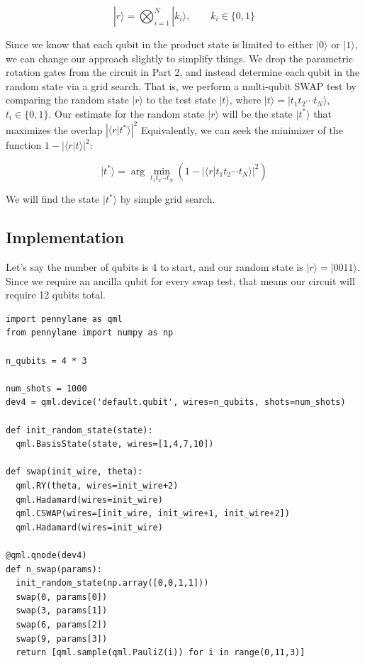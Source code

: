 \documentclass[11pt]{article}
\begin{document}
\begin{equation*}
  |r\rangle = \bigotimes_{i=1}^{N}|k_{i}\rangle, \qquad k_{i} \in \{0,1\}
\end{equation*}

Since we know that each qubit in the product state is limited to either \(|0\rangle\) or \(|1\rangle\), we can change our approach slightly to simplify things.
We drop the parametric rotation gates from the circuit in Part 2, and instead determine each qubit in the random state via a grid search.
That is, we perform a multi-qubit SWAP test by comparing the random state \(|r\rangle\) to the test state \(|t\rangle\), where \(|t\rangle = |t_1 t_2 \cdots t_N \rangle\), \(t_i \in \{ 0, 1\}\). Our estimate for the random state \(|r\rangle\) will be the state \(|t^*\rangle\) that maximizes the overlap \(\left|\langle r | t^* \rangle\right|^2\)
Equivalently, we can seek the minimizer of the function \(1-\left|\langle r | t\rangle\right|^2\):

\begin{equation*}
|t^*\rangle = \arg\min_{t_{1}t_{2}\cdots t_{N}}(1-\left|\langle r | t_1 t_2 \cdots t_N \rangle\right|^2)
\end{equation*}

We will find the state \(|t^*\rangle\) by simple grid search.

\subsection{Implementation}
\label{sec:orgd87c9eb}

Let's say the number of qubits is 4 to start, and our random state is \(|r\rangle = |0011\rangle\).
Since we require an ancilla qubit for every swap test, that means our circuit will require 12 qubits total.

\begin{verbatim}
import pennylane as qml
from pennylane import numpy as np

n_qubits = 4 * 3

num_shots = 1000
dev4 = qml.device('default.qubit', wires=n_qubits, shots=num_shots)

def init_random_state(state):
  qml.BasisState(state, wires=[1,4,7,10])

def swap(init_wire, theta):
  qml.RY(theta, wires=init_wire+2)
  qml.Hadamard(wires=init_wire)
  qml.CSWAP(wires=[init_wire, init_wire+1, init_wire+2])
  qml.Hadamard(wires=init_wire)

@qml.qnode(dev4)
def n_swap(params):
  init_random_state(np.array([0,0,1,1]))
  swap(0, params[0])
  swap(3, params[1])
  swap(6, params[2])
  swap(9, params[3])
  return [qml.sample(qml.PauliZ(i)) for i in range(0,11,3)]
\end{verbatim}
\end{document}
